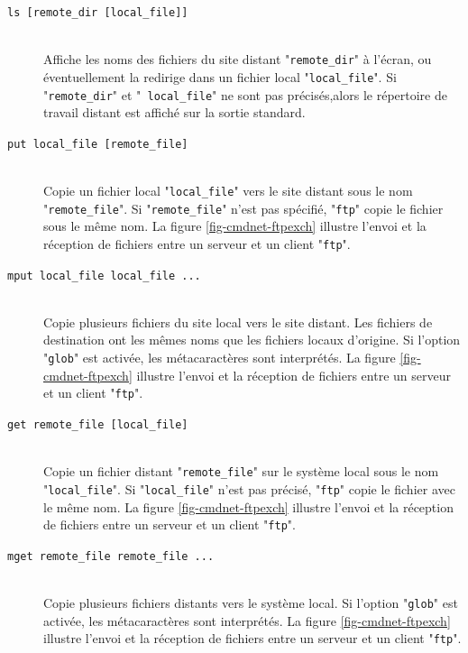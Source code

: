 \begin{description}
	\item[{\tt ls [remote\_dir [local\_file]]}]\mbox{}\\
	Affiche les noms des fichiers du site distant "{\tt remote\_dir}"
	{\`a} l'{\'e}cran, ou {\'e}ventuellement la redirige dans un fichier local
	"{\tt local\_file}". Si "{\tt remote\_dir}" et "{\tt
	local\_file}" ne sont pas pr{\'e}cis{\'e}s,alors le r{\'e}pertoire de travail
	distant est affich{\'e} sur la sortie standard.


	\item[{\tt put local\_file [remote\_file]}]\mbox{}\\
	Copie un fichier local "{\tt local\_file}" vers le site distant
	sous le nom "{\tt remote\_file}". Si "{\tt remote\_file}" n'est
	pas sp{\'e}cifi{\'e}, "{\tt ftp}" copie le fichier sous le m{\^e}me nom. La figure
	\ref{fig-cmdnet-ftpexch} illustre l'envoi et la r{\'e}ception de fichiers
	entre un serveur et un client "{\tt ftp}".


	\item[{\tt mput local\_file local\_file ...}]\mbox{}\\
	Copie plusieurs fichiers du site local vers le site distant. Les
	fichiers de destination ont les m{\^e}mes noms que les fichiers locaux
	d'origine. Si l'option "{\tt glob}" est activ{\'e}e, les
	m{\'e}tacaract{\`e}res sont interpr{\'e}t{\'e}s. La figure \ref{fig-cmdnet-ftpexch}
	illustre l'envoi et la r{\'e}ception de fichiers entre un serveur et un
	client "{\tt ftp}".


	\item[{\tt get remote\_file [local\_file]}]\mbox{}\\
	Copie un fichier distant "{\tt remote\_file}" sur le syst{\`e}me local
	sous le nom "{\tt local\_file}". Si "{\tt local\_file}" n'est
	pas pr{\'e}cis{\'e}, "{\tt ftp}" copie le fichier avec le m{\^e}me nom. La figure
	\ref{fig-cmdnet-ftpexch} illustre l'envoi et la r{\'e}ception de fichiers
	entre un serveur et un client "{\tt ftp}".


	\item[{\tt mget remote\_file remote\_file ...}]\mbox{}\\
	Copie plusieurs fichiers distants vers le syst{\`e}me local. Si l'option
	"{\tt glob}" est activ{\'e}e, les m{\'e}tacaract{\`e}res sont interpr{\'e}t{\'e}s. La figure
	\ref{fig-cmdnet-ftpexch} illustre l'envoi et la r{\'e}ception de fichiers
	entre un serveur et un client "{\tt ftp}".


\end{description}
